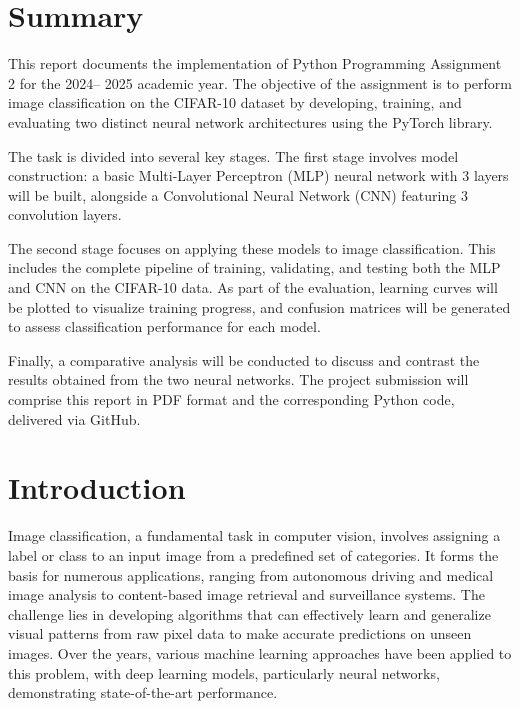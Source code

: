 \documentclass[12pt, a4paper]{report}
\begin{document}
\setlength{\parindent}{2em}  %

\cleardoublepage  %
\chapter*{Summary}  %
This report documents the implementation of Python Programming Assignment 2 for the 2024– 2025 academic year. The objective of the assignment is to perform image classification on the CIFAR-10 dataset by developing, training, and evaluating two distinct neural network architectures using the PyTorch library.

The task is divided into several key stages. The first stage involves model construction: a basic Multi-Layer Perceptron (MLP) neural network with 3 layers will be built, alongside a Convolutional Neural Network (CNN) featuring 3 convolution layers.

The second stage focuses on applying these models to image classification. This includes the complete pipeline of training, validating, and testing both the MLP and CNN on the CIFAR-10 data. As part of the evaluation, learning curves will be plotted to visualize training progress, and confusion matrices will be generated to assess classification performance for each model.

Finally, a comparative analysis will be conducted to discuss and contrast the results obtained from the two neural networks. The project submission will comprise this report in PDF format and the corresponding Python code, delivered via GitHub. 

\tableofcontents


\chapter{Introduction}
Image classification, a fundamental task in computer vision, involves assigning a label or class to an input image from a predefined set of categories. It forms the basis for numerous applications, ranging from autonomous driving and medical image analysis to content-based image retrieval and surveillance systems. The challenge lies in developing algorithms that can effectively learn and generalize visual patterns from raw pixel data to make accurate predictions on unseen images. Over the years, various machine learning approaches have been applied to this problem, with deep learning models, particularly neural networks, demonstrating state-of-the-art performance. 
\end{document}

